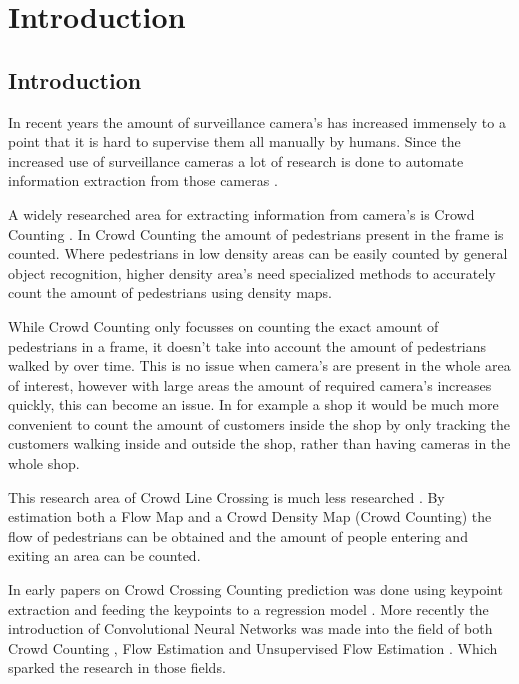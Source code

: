 \chapter{Introduction}
\section{Introduction}
In recent years the amount of surveillance camera's has increased immensely to a point that it is hard to supervise them all manually by humans. Since the increased use of surveillance cameras a lot of research is done to automate information extraction from those cameras \cite{Sreenu2019}.

A widely researched area for extracting information from camera's is Crowd Counting \cite{Chan2008, wang2020nwpu, li2018csrnet, Fang2019, Liu2019}. In Crowd Counting the amount of pedestrians present in the frame is counted. Where pedestrians in low density areas can be easily counted by general object recognition, higher density area's need specialized methods to accurately count the amount of pedestrians \cite{Zhang2016} using density maps.

While Crowd Counting only focusses on counting the exact amount of pedestrians in a frame, it doesn't take into account the amount of pedestrians walked by over time. This is no issue when camera's are present in the whole area of interest, however with large areas the amount of required camera's increases quickly, this can become an issue. In for example a shop it would be much more convenient to count the amount of customers inside the shop by only tracking the customers walking inside and outside the shop, rather than having cameras in the whole shop.

This research area of Crowd Line Crossing is much less researched \cite{Ma2013, leibe_crossing-line_2016, zheng_cross-line_2019}. By estimation both a Flow Map and a Crowd Density Map (Crowd Counting) the flow of pedestrians can be obtained and the amount of people entering and exiting an area can be counted.

In early papers on Crowd Crossing Counting prediction was done using keypoint extraction and feeding the keypoints to a regression model \cite{ma_counting_2016, Ma2013}. More recently the introduction of Convolutional Neural Networks was made into the field of both Crowd Counting \cite{Zhang2016, Liu2019, li2018csrnet, wang2020nwpu}, Flow Estimation \cite{sun_pwc-net_2018, Dosovitskiy2015} and Unsupervised Flow Estimation \cite{Yu2016, Janai2018, liu_ddflow_2019, liu_selflow_2019}. Which sparked the research in those fields.


